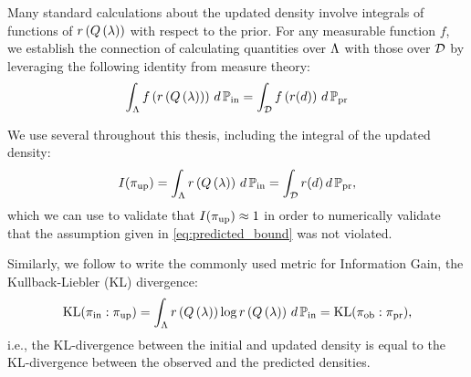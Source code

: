 Many standard calculations about the updated density involve integrals of functions of $r\left ( Q\left ( \lambda \right ) \right )$ with respect to the prior.
For any measurable function $f$, we establish the connection of calculating quantities over ${\Lambda}$ with those over $\mathcal{D}$ by leveraging the following identity from measure theory:
\[
\int_{\Lambda} f\left( r\left ( Q\left ( \lambda \right ) \right ) \right ) \, d\operatorname*{\mathbb{P}_{in}} = \int_{\mathcal{D}} f\left( r(d) \right ) \, d\operatorname*{\mathbb{P}_{pr}}
\]

We use several throughout this thesis, including the integral of the updated density:
\[
I(\operatorname*{\pi_{up}} ) = \int_{\Lambda} r\left ( Q\left ( \lambda \right ) \right ) \, d\operatorname*{\mathbb{P}_{in}} = \int_{\mathcal{D}} r(d) \, d\operatorname*{\mathbb{P}_{pr}} ,
\]
which we can use to validate that $I(\operatorname*{\pi_{up}}) \approx 1$ in order to numerically validate that the assumption given in \eqref{eq:predicted_bound} was not violated.

Similarly, we follow \cite{BJW18} to write the commonly used metric for Information Gain, the Kullback-Liebler (KL) divergence:
\begin{equation}\label{eq:KLdiv}
\text{KL}(\operatorname*{\pi_{in}} : \operatorname*{\pi_{up}} ) = \int_{\Lambda} r\left ( Q\left ( \lambda \right ) \right ) \log r\left ( Q\left ( \lambda \right ) \right ) \, d\operatorname*{\mathbb{P}_{in}} = \text{KL}(\operatorname*{\pi_{ob}} : \operatorname*{\pi_{pr}} ),
\end{equation}
i.e., the KL-divergence between the initial and updated density is equal to the KL-divergence between the observed and the predicted densities.

